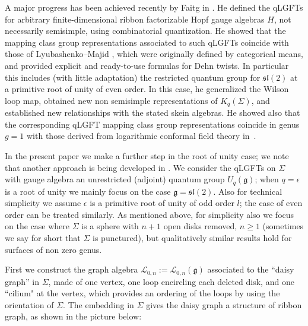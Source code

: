 \documentclass[pdftex]{sigma}%
\numberwithin{equation}{section}
\numberwithin{figure}{section}
\newcommand{\e}{\epsilon}
\newcommand{\Ll}{{\mathcal L}}
\begin{document}
A major progress has been achieved recently by Faitg in \cite{Faitg3,Faitg,Faitg2,Faitg4}. He defined the qLGFTs for arbitrary finite-dimensional ribbon factorizable Hopf gauge algebras $H$, not necessarily semisimple, using combinatorial quantization. He showed that the mapping class group representations associated to such qLGFTs coincide with those of Lyubashenko--Majid \cite{Lyu, LM}, which were originally defined by categorical means, and provided explicit and ready-to-use formulas for Dehn twists. In particular this includes (with little adaptation) the restricted quantum group for ${\mathfrak{sl}}(2)$ at a primitive root of unity of even order. In this case, he generalized the Wilson loop map, obtained new non semisimple representations of $K_q(\Sigma)$, and established new relationships with the stated skein algebras. He showed also that the corresponding qLGFT mapping class group representations coincide in genus $g=1$ with those derived from logarithmic conformal field theory in~\cite{FGST}.

 In the present paper we make a further step in the root of unity case; we note that another approach is being developed in \cite{G-J-S}. We consider the qLGFTs on $\Sigma$ with gauge algebra an unrestricted (adjoint) quantum group $U_q(\mathfrak{g})$; when $q=\e$ is a root of unity we mainly focus on the case $\mathfrak{g}={\mathfrak{sl}}(2)$. Also for technical simplicity we assume $\e$ is a primitive root of unity of odd order $l$; the case of even order can be treated similarly. As mentioned above, for simplicity also we focus on the case where $\Sigma$ is a sphere with $n+1$ open disks removed, $n\geq 1$ (sometimes we say for short that $\Sigma$ is punctured), but qualitatively similar results hold for surfaces of non zero genus.

First we construct the graph algebra $\Ll_{0,n} := \Ll_{0,n}(\mathfrak{g})$ associated to the ``daisy graph'' in $\Sigma$, made of one vertex, one loop encircling each deleted disk, and one ``cilium" at the vertex, which provides an ordering of the loops by using the orientation of $\Sigma$. The embedding in $\Sigma$ gives the daisy graph a structure of ribbon graph, as shown in the picture below:
\end{document}
